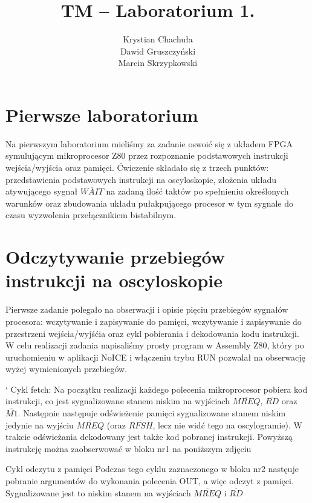 \documentclass[fleqn]{article}
\title{TM -- Laboratorium 1.}
\author{Krystian Chachuła \\ Dawid Gruszczyński \\ Marcin Skrzypkowski}
\begin{document}
\maketitle

\setcounter{page}{0}
\thispagestyle{empty}

\pagebreak

\setcounter{page}{1}

\section{Pierwsze laboratorium}

Na pierwszym laboratorium mieliśmy za zadanie oswoić się z układem FPGA symulującym mikroprocesor Z80 przez rozpoznanie podstawowych instrukcji wejścia/wyjścia oraz pamięci. Ćwiczenie składało się z trzech punktów: przedstawienia podstawowych instrukcji na oscyloskopie, złożenia układu atywującego sygnał $\overline{WAIT}$ na zadaną ilość taktów po spełnieniu określonych warunków oraz zbudowania układu pułakpującego procesor w tym sygnale do czasu wyzwolenia przełącznikiem bistabilnym. 

\section{Odczytywanie przebiegów instrukcji na oscyloskopie}
Pierwsze zadanie polegało na obserwacji i opisie pięciu przebiegów sygnałów procesora: wczytywanie i zapisywanie do pamięci, wczytywanie i zapisywanie do przestrzeni wejścia/wyjśćia oraz cykl pobierania i dekodowania kodu instrukcji.
W celu realizacji zadania napisaliśmy prosty program w Assembly Z80, który po uruchomieniu w aplikacji NoICE i włączeniu trybu RUN pozwalał na obserwację wyżej wymienionych przebiegów.

`
Cykl fetch:
Na początku realizacji każdego polecenia mikroprocesor pobiera kod instrukcji, co jest sygnalizowane stanem niskim na wyjściach $\overline{MREQ}$, $\overline{RD}$ oraz $\overline{M1}$. Następnie następuje odświeżenie pamięci sygnalizowane stanem niskim jedynie na wyjściu $\overline{MREQ}$ (oraz $\overline{RFSH}$, lecz nie widć tego na oscylogramie). W trakcie odświeżania dekodowany jest także kod pobranej instrukcji.
Powyższą instrukcję można zaobserwować w bloku nr1 na poniższym zdjęciu

Cykl odczytu z pamięci
Podczas tego cyklu zaznaczonego w bloku nr2 nastęuje pobranie argumentów do wykonania polecenia OUT, a więc odczyt z pamięci.
Sygnalizowane jest to niskim stanem na wyjściach $\overline{MREQ}$ i $\overline{RD}$
\end{document}
